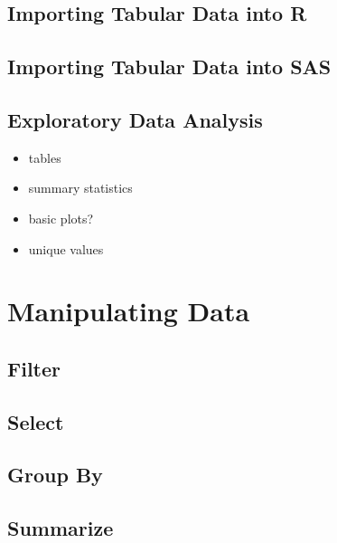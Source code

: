 \documentclass[]{book}
\providecommand{\tightlist}{%
  \setlength{\itemsep}{0pt}\setlength{\parskip}{0pt}}
\begin{document}
\hypertarget{importing-tabular-data-into-r}{%
\section{Importing Tabular Data into R}\label{importing-tabular-data-into-r}}

\hypertarget{importing-tabular-data-into-sas}{%
\section{Importing Tabular Data into SAS}\label{importing-tabular-data-into-sas}}

\hypertarget{exploratory-data-analysis}{%
\section{Exploratory Data Analysis}\label{exploratory-data-analysis}}

\begin{itemize}
\tightlist
\item
  tables
\item
  summary statistics
\item
  basic plots?
\item
  unique values
\end{itemize}

\hypertarget{manipulating-data}{%
\chapter{Manipulating Data}\label{manipulating-data}}

\hypertarget{filter}{%
\section{Filter}\label{filter}}

\hypertarget{select}{%
\section{Select}\label{select}}

\hypertarget{group-by}{%
\section{Group By}\label{group-by}}

\hypertarget{summarize}{%
\section{Summarize}\label{summarize}}
\end{document}
